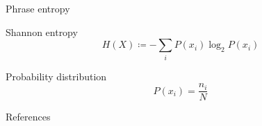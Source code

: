 \documentclass[handout]{beamer}
\begin{document}
\begin{frame}{Phrase entropy}
    \begin{block}{Shannon entropy}
        \begin{equation*}
            H(X)\coloneq-\sum_i P(x_i)\log_2 P(x_i)
        \end{equation*}
    \end{block}
    \begin{block}{Probability distribution}
        \begin{equation*}
            P(x_i)=\frac{n_i}{N}
        \end{equation*}
    \end{block}
    \hfill\cite{li_automatic_2019}

\end{frame}

\begin{frame}[allowframebreaks]{References}
    \printbibliography[heading=none]
\end{frame}
\end{document}
